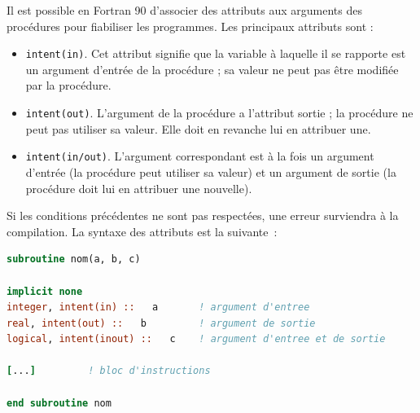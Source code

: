 \documentclass[a4paper,twoside]{article}
\begin{document}
Il est possible en Fortran 90 d'associer des attributs aux arguments des procédures pour fiabiliser les programmes. Les principaux attributs sont : 
\begin{itemize}
\item  \texttt{intent(in)}. Cet attribut signifie que la variable à laquelle il se rapporte est un argument d'entrée de la procédure ; sa valeur ne peut pas être modifiée par la procédure. 

\item  \texttt{intent(out)}. L'argument de la procédure a l'attribut sortie ; la procédure ne peut pas utiliser sa valeur. Elle doit en revanche lui en attribuer une.

\item  \texttt{intent(in/out)}. L'argument correspondant est à la fois un argument d'entrée (la procédure peut utiliser sa valeur) et un argument de sortie (la procédure doit lui en attribuer une nouvelle). 
\end{itemize}
Si les conditions précédentes ne sont pas respectées, une erreur surviendra à la compilation. La syntaxe des attributs est la suivante~: 
\begin{lstlisting}[language=Fortran]
subroutine nom(a, b, c)
 
implicit none         
integer, intent(in) ::   a       ! argument d'entree 
real, intent(out) ::   b         ! argument de sortie 
logical, intent(inout) ::   c    ! argument d'entree et de sortie
 
[...]         ! bloc d'instructions
 
end subroutine nom 
\end{lstlisting}




\end{document}
